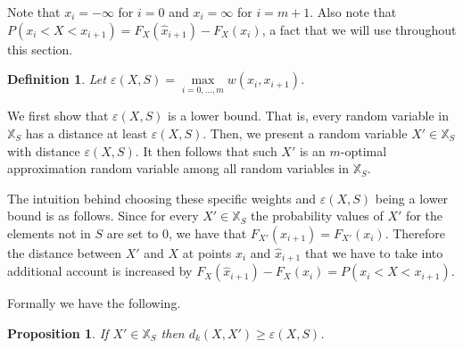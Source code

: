 \documentclass{article}
\newtheorem{definition}[thm]{Definition}
\newtheorem{proposition}[thm]{Proposition}
\begin{document}
Note that $x_i = -\infty$ for $i=0$ and $x_i=\infty$ for $i=m+1$. Also note that $P(x_i < X < x_{i+1}) = F_X(\hat x_{i+1}) - F_X(x_i)$, a fact that we will use throughout this section.

\begin{definition}
Let $\varepsilon(X,S) = \max\limits_{i=0,\dots,m} w(x_{i}, x_{i+1})$.
\end{definition}



We first show that $\varepsilon(X,S)$ is a lower bound. That is, every random variable in $\mathbb{X}_S$ has a distance at least $\varepsilon(X,S)$. Then, we present a random variable $X'\in \mathbb{X}_S$ with distance $\varepsilon(X,S)$. It then follows that such $X'$ is an $m$-optimal approximation random variable among all random variables in $\mathbb{X}_S$.

The intuition behind choosing these specific weights and $\varepsilon(X,S)$ being a lower bound is as follows.  Since for every $X'\in\mathbb{X}_S$ the probability values of $X'$ for the elements not in $S$ are set to $0$, we have that $F_{X'}(\hat x_{i+1})=F_{X'}(x_i)$. Therefore the distance between $X'$ and $X$ at points $x_i$ and $\hat x_{i+1}$ that we have to take into additional account is increased by $F_X(\hat x_{i+1})-F_X(x_i) = P(x_i < X < x_{i+1})$.

Formally we have the following.

\begin{proposition}\label{prop:minimal}
	If $X'\in\mathbb{X}_S$ then $d_k(X,X') \geq \varepsilon(X,S)$.
\end{proposition}
\end{document}
